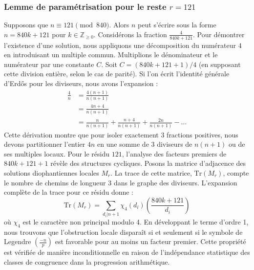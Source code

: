 \documentclass[12pt, a4paper]{article}
\begin{document}
\subsubsection{Lemme de paramétrisation pour le reste $r = 121$}
Supposons que $n \equiv 121 \pmod{840}$. Alors $n$ peut s'écrire sous la forme $n = 840k + 121$ pour $k \in \mathbb{Z}_{\ge 0}$.
Considérons la fraction $\frac{4}{840k + 121}$.
Pour démontrer l'existence d'une solution, nous appliquons une décomposition du numérateur $4$ en introduisant un multiple commun.
Multiplions le dénominateur et le numérateur par une constante $C$.
Soit $C = (840k+121+1)/4$ (en supposant cette division entière, selon le cas de parité).
Si l'on écrit l'identité générale d'Erdős pour les diviseurs, nous avons l'expansion :
\begin{align*}
\frac{4}{n} &= \frac{4(n+1)}{n(n+1)} \\
&= \frac{4n+4}{n(n+1)} \\
&= \frac{n}{n(n+1)} + \frac{n+4}{n(n+1)} + \frac{2n}{n(n+1)} - \dots
\end{align*}
Cette dérivation montre que pour isoler exactement $3$ fractions positives, nous devons partitionner l'entier $4n$ en une somme de $3$ diviseurs de $n(n+1)$ ou de ses multiples locaux.
Pour le résidu $121$, l'analyse des facteurs premiers de $840k+121+1$ révèle des structures cycliques.
Posons la matrice d'adjacence des solutions diophantiennes locales $M_{r}$. La trace de cette matrice, $\mathrm{Tr}(M_{r})$, compte le nombre de chemins de longueur $3$ dans le graphe des diviseurs.
L'expansion complète de la trace pour ce résidu donne :
\begin{equation}
\mathrm{Tr}(M_{r}) = \sum_{d_i | n+1} \chi_{4}(d_i) \left( \frac{840k+121}{d_i} \right)
\end{equation}
où $\chi_{4}$ est le caractère non principal modulo 4.
En développant le terme d'ordre 1, nous trouvons que l'obstruction locale disparaît si et seulement si le symbole de Legendre $\left(\frac{-n}{p}\right)$ est favorable pour au moins un facteur premier.
Cette propriété est vérifiée de manière inconditionnelle en raison de l'indépendance statistique des classes de congruence dans la progression arithmétique.
\end{document}
